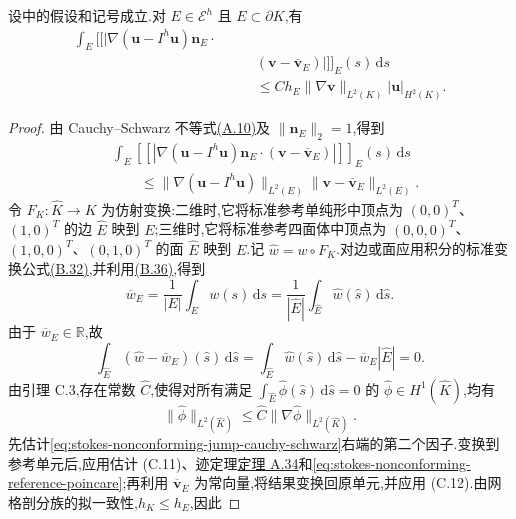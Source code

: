 \begin{lemma}\label{lem:stokes-nonconforming-jump-estimate}
设中的假设和记号成立.对 $E\in\mathcal{E}^h$ 且 $E\subset\partial K$,有
\[
\begin{aligned}
  \int_E\bigl[\!\bigl[
    \bigl|\nabla(\bm{u}-I^h\bm{u})\bm{n}_E\cdot\\
  &\qquad(\bm{v}-\overline{\bm{v}}_E)\bigr|
  \bigr]\!\bigr]_E(s)\,\mathrm{d}s\\
  &\qquad\leq Ch_E\|\nabla\bm{v}\|_{L^2(K)}|\bm{u}|_{H^2(K)}.
\end{aligned}
\]
\end{lemma}
\begin{proof}
由 Cauchy--Schwarz 不等式\hyperref[eq:appendix-a-10]{(A.10)}及 $\|\bm{n}_E\|_2=1$,得到
\begin{equation}\label{eq:stokes-nonconforming-jump-cauchy-schwarz}
\begin{aligned}
  &\int_E\left[\!\left[
    \left|\nabla(\bm{u}-I^h\bm{u})\bm{n}_E
      \cdot(\bm{v}-\overline{\bm{v}}_E)\right|
  \right]\!\right]_E(s)\,\mathrm{d}s\\
  &\qquad\leq
    \|\nabla(\bm{u}-I^h\bm{u})\|_{L^2(E)}
    \|\bm{v}-\overline{\bm{v}}_E\|_{L^2(E)}.
\end{aligned}
\end{equation}
令 $F_K:\widehat K\to K$ 为仿射变换:二维时,它将标准参考单纯形中顶点为 $(0,0)^T$、$(1,0)^T$ 的边 $\widehat E$ 映到 $E$;三维时,它将标准参考四面体中顶点为 $(0,0,0)^T$、$(1,0,0)^T$、$(0,1,0)^T$ 的面 $\widehat E$ 映到 $E$.记 $\widehat w=w\circ F_K$.对边或面应用积分的标准变换公式\hyperref[eq:appendix-b-32]{(B.32)},并利用\hyperref[eq:appendix-b-36]{(B.36)},得到
\[
  \overline w_E=\frac1{|E|}\int_Ew(s)\,\mathrm{d}s
  =\frac1{|\widehat E|}\int_{\widehat E}\widehat w(\widehat s)\,\mathrm{d}\widehat s.
\]
由于 $\overline w_E\in\mathbb{R}$,故
\[
  \int_{\widehat E}(\widehat w-\overline w_E)(\widehat s)\,\mathrm{d}\widehat s
  =\int_{\widehat E}\widehat w(\widehat s)\,\mathrm{d}\widehat s
    -\overline w_E|\widehat E|=0.
\]
由引理 C.3,存在常数 $\widehat C$,使得对所有满足
$\int_{\widehat E}\widehat\phi(\widehat s)\,\mathrm{d}\widehat s=0$ 的
$\widehat\phi\in H^1(\widehat K)$,均有
\begin{equation}\label{eq:stokes-nonconforming-reference-poincare}
  \|\widehat\phi\|_{L^2(\widehat K)}
  \leq\widehat C\|\nabla\widehat\phi\|_{L^2(\widehat K)}.
\end{equation}
先估计\cref{eq:stokes-nonconforming-jump-cauchy-schwarz}右端的第二个因子.变换到参考单元后,应用估计 (C.11)、迹定理\hyperref[thm:appendix-a-34]{定理 A.34}和\cref{eq:stokes-nonconforming-reference-poincare};再利用 $\overline{\bm{v}}_E$ 为常向量,将结果变换回原单元,并应用 (C.12).由网格剖分族的拟一致性,$h_K\leq h_E$,因此

\end{proof}
